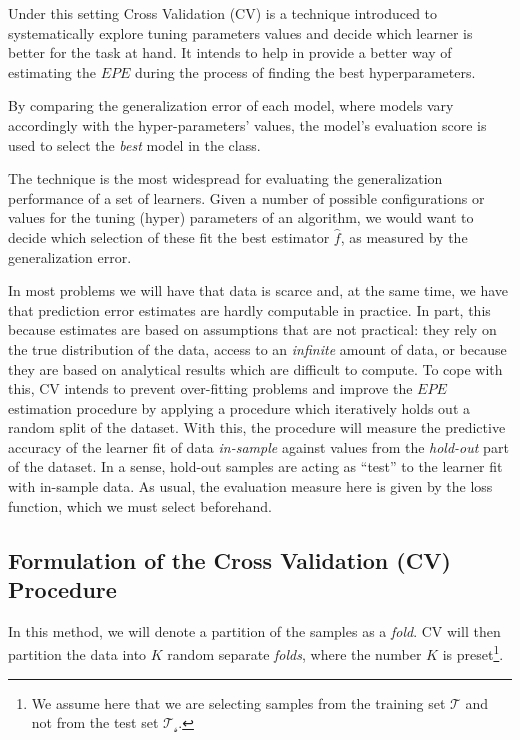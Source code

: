 Under this setting Cross Validation (CV) is a technique introduced to systematically explore tuning parameters values and decide which learner is better for the task at hand.
It intends to help in provide a better way of estimating the $EPE$ during the process of finding the best hyperparameters.

By comparing the generalization error of each model, where models vary accordingly with the hyper-parameters' values, the model's evaluation score is used to select the \textit{best} model in the class.

The technique is the most widespread for evaluating the generalization performance of a set of learners.
Given a number of possible configurations or values for the tuning (hyper) parameters of an algorithm, we would want to decide which selection of these fit the best estimator $\hat{f}$, as measured by the generalization error.

%

In most problems we will have that data is scarce and, at the same time, we have that prediction error estimates are hardly computable in practice.
In part, this because estimates are based on assumptions that are not practical: they rely on the true distribution of the data, access to an \textit{infinite} amount of data, or because they are based on analytical results which are difficult to compute.
To cope with this, CV intends to prevent over-fitting problems and improve the $EPE$ estimation procedure by applying a procedure which iteratively holds out a random split of the dataset.
With this, the procedure will measure the predictive accuracy of the learner fit of data \textit{in-sample} against values from the \textit{hold-out} part of the dataset.
In a sense, hold-out samples are acting as ``test''  to the learner fit with in-sample data.
As usual, the evaluation measure here is given by the loss function, which we must select beforehand.

\subsection{Formulation of the Cross Validation (CV) Procedure}\label{subsection:crossValidationProcedure}

In this method, we will denote a partition of the samples as a \textit{fold}.
CV will then partition the data into $K$ random separate \textit{folds}, where the number $K$ is preset\footnote{ We assume here that we are selecting samples from the training set $\mathcal{T}$ and not from the test set $\mathcal{T_s}$.}.


